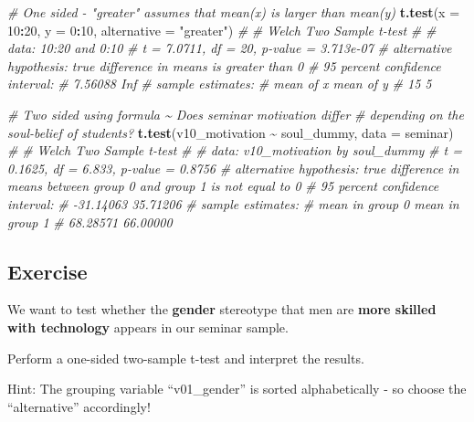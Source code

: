 \documentclass[
]{book}
\newenvironment{Shaded}{\begin{snugshade}}{\end{snugshade}}
\newcommand{\AttributeTok}[1]{\textcolor[rgb]{0.13,0.29,0.53}{#1}}
\newcommand{\CommentTok}[1]{\textcolor[rgb]{0.56,0.35,0.01}{\textit{#1}}}
\newcommand{\DecValTok}[1]{\textcolor[rgb]{0.00,0.00,0.81}{#1}}
\newcommand{\FunctionTok}[1]{\textcolor[rgb]{0.13,0.29,0.53}{\textbf{#1}}}
\newcommand{\NormalTok}[1]{#1}
\newcommand{\SpecialCharTok}[1]{\textcolor[rgb]{0.81,0.36,0.00}{\textbf{#1}}}
\newcommand{\StringTok}[1]{\textcolor[rgb]{0.31,0.60,0.02}{#1}}
\begin{document}
\begin{Shaded}
\begin{Highlighting}[]
\CommentTok{\# One sided {-} "greater" assumes that mean(x) is larger than mean(y)}
\FunctionTok{t.test}\NormalTok{(}\AttributeTok{x =} \DecValTok{10}\SpecialCharTok{:}\DecValTok{20}\NormalTok{, }\AttributeTok{y =} \DecValTok{0}\SpecialCharTok{:}\DecValTok{10}\NormalTok{, }\AttributeTok{alternative =} \StringTok{"greater"}\NormalTok{)}
\CommentTok{\# }
\CommentTok{\#   Welch Two Sample t{-}test}
\CommentTok{\# }
\CommentTok{\# data:  10:20 and 0:10}
\CommentTok{\# t = 7.0711, df = 20, p{-}value = 3.713e{-}07}
\CommentTok{\# alternative hypothesis: true difference in means is greater than 0}
\CommentTok{\# 95 percent confidence interval:}
\CommentTok{\#  7.56088     Inf}
\CommentTok{\# sample estimates:}
\CommentTok{\# mean of x mean of y }
\CommentTok{\#        15         5}

\CommentTok{\# Two sided using formula \textasciitilde{} Does seminar motivation differ}
\CommentTok{\# depending on the soul{-}belief of students?}
\FunctionTok{t.test}\NormalTok{(v10\_motivation }\SpecialCharTok{\textasciitilde{}}\NormalTok{ soul\_dummy, }\AttributeTok{data =}\NormalTok{ seminar)}
\CommentTok{\# }
\CommentTok{\#   Welch Two Sample t{-}test}
\CommentTok{\# }
\CommentTok{\# data:  v10\_motivation by soul\_dummy}
\CommentTok{\# t = 0.1625, df = 6.833, p{-}value = 0.8756}
\CommentTok{\# alternative hypothesis: true difference in means between group 0 and group 1 is not equal to 0}
\CommentTok{\# 95 percent confidence interval:}
\CommentTok{\#  {-}31.14063  35.71206}
\CommentTok{\# sample estimates:}
\CommentTok{\# mean in group 0 mean in group 1 }
\CommentTok{\#        68.28571        66.00000}
\end{Highlighting}
\end{Shaded}

\subsection{\texorpdfstring{Exercise }{Exercise }}\label{exercise-4}

We want to test whether the \textbf{gender} stereotype that men are \textbf{more skilled with technology} appears in our seminar sample.

Perform a one-sided two-sample t-test and interpret the results.

Hint: The grouping variable ``v01\_gender'' is sorted alphabetically - so choose the ``alternative'' accordingly!
\end{document}
